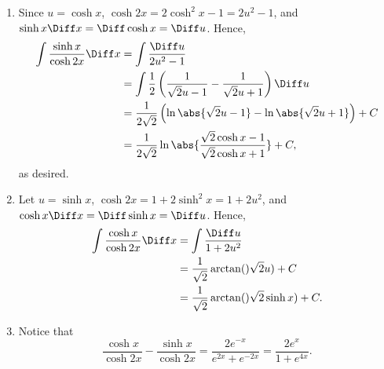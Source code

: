 \Question{\currfilebase}
\begin{enumerate}
    \item Since \(u = \cosh x\), \(\cosh 2x = 2 \cosh^2 x - 1 = 2 u^2 - 1\), and \(\sinh x \Diff x = \Diff \cosh x = \Diff u\). Hence,
          \begin{align*}
              \int \frac{\sinh x}{\cosh 2x} \Diff x & = \int \frac{\Diff u}{2 u^2 - 1}                                                          \\
                                                    & = \int \frac{1}{2} \left(\frac{1}{\sqrt{2}u - 1} - \frac{1}{\sqrt{2}u + 1}\right) \Diff u \\
                                                    & = \frac{1}{2\sqrt{2}} \left(\ln\abs{\sqrt{2}u - 1} - \ln\abs{\sqrt{2}u + 1}\right) + C    \\
                                                    & = \frac{1}{2\sqrt{2}} \ln\abs{\frac{\sqrt{2}\cosh x - 1}{\sqrt{2}\cosh x + 1}} + C,
          \end{align*}
          as desired.

    \item Let \(u = \sinh x\), \(\cosh 2x = 1 + 2\sinh^2 x = 1 + 2u^2\), and \(\cosh x \Diff x = \Diff \sinh x = \Diff u\). Hence,
          \begin{align*}
              \int \frac{\cosh x}{\cosh 2x} \Diff x & = \int \frac{\Diff u}{1 + 2u^2}                      \\
                                                    & = \frac{1}{\sqrt{2}}\arctan()\sqrt{2}u) + C          \\
                                                    & = \frac{1}{\sqrt{2}} \arctan()\sqrt{2} \sinh x) + C.
          \end{align*}

    \item Notice that
          \[
              \frac{\cosh x}{\cosh 2x} - \frac{\sinh x}{\cosh 2x} = \frac{2e^{-x}}{e^{2x} + e^{-2x}} = \frac{2e^{x}}{1 + e^{4x}}.
          \]


\end{enumerate}
